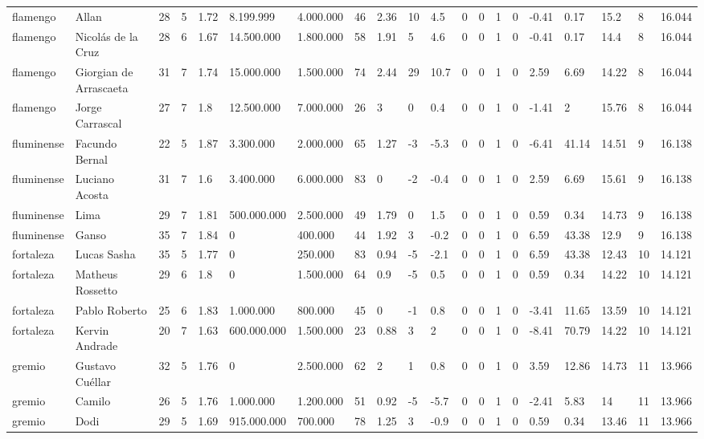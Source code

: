 \begin{longtable}{llllllllllllllllllll}
flamengo & Allan & 28 & 5 & 1.72 & 8.199.999 & 4.000.000 & 46 & 2.36 & 10 & 4.5 & 0 & 0 & 1 & 0 & -0.41 & 0.17 & 15.2 & 8 & 16.044 \\
flamengo & Nicolás de la Cruz & 28 & 6 & 1.67 & 14.500.000 & 1.800.000 & 58 & 1.91 & 5 & 4.6 & 0 & 0 & 1 & 0 & -0.41 & 0.17 & 14.4 & 8 & 16.044 \\
flamengo & Giorgian de Arrascaeta & 31 & 7 & 1.74 & 15.000.000 & 1.500.000 & 74 & 2.44 & 29 & 10.7 & 0 & 0 & 1 & 0 & 2.59 & 6.69 & 14.22 & 8 & 16.044 \\
flamengo & Jorge Carrascal & 27 & 7 & 1.8 & 12.500.000 & 7.000.000 & 26 & 3 & 0 & 0.4 & 0 & 0 & 1 & 0 & -1.41 & 2 & 15.76 & 8 & 16.044 \\
fluminense & Facundo Bernal & 22 & 5 & 1.87 & 3.300.000 & 2.000.000 & 65 & 1.27 & -3 & -5.3 & 0 & 0 & 1 & 0 & -6.41 & 41.14 & 14.51 & 9 & 16.138 \\
fluminense & Luciano Acosta & 31 & 7 & 1.6 & 3.400.000 & 6.000.000 & 83 & 0 & -2 & -0.4 & 0 & 0 & 1 & 0 & 2.59 & 6.69 & 15.61 & 9 & 16.138 \\
fluminense & Lima & 29 & 7 & 1.81 & 500.000.000 & 2.500.000 & 49 & 1.79 & 0 & 1.5 & 0 & 0 & 1 & 0 & 0.59 & 0.34 & 14.73 & 9 & 16.138 \\
fluminense & Ganso & 35 & 7 & 1.84 & 0 & 400.000 & 44 & 1.92 & 3 & -0.2 & 0 & 0 & 1 & 0 & 6.59 & 43.38 & 12.9 & 9 & 16.138 \\
fortaleza & Lucas Sasha & 35 & 5 & 1.77 & 0 & 250.000 & 83 & 0.94 & -5 & -2.1 & 0 & 0 & 1 & 0 & 6.59 & 43.38 & 12.43 & 10 & 14.121 \\
fortaleza & Matheus Rossetto & 29 & 6 & 1.8 & 0 & 1.500.000 & 64 & 0.9 & -5 & 0.5 & 0 & 0 & 1 & 0 & 0.59 & 0.34 & 14.22 & 10 & 14.121 \\
fortaleza & Pablo Roberto & 25 & 6 & 1.83 & 1.000.000 & 800.000 & 45 & 0 & -1 & 0.8 & 0 & 0 & 1 & 0 & -3.41 & 11.65 & 13.59 & 10 & 14.121 \\
fortaleza & Kervin Andrade & 20 & 7 & 1.63 & 600.000.000 & 1.500.000 & 23 & 0.88 & 3 & 2 & 0 & 0 & 1 & 0 & -8.41 & 70.79 & 14.22 & 10 & 14.121 \\
gremio & Gustavo Cuéllar & 32 & 5 & 1.76 & 0 & 2.500.000 & 62 & 2 & 1 & 0.8 & 0 & 0 & 1 & 0 & 3.59 & 12.86 & 14.73 & 11 & 13.966 \\
gremio & Camilo & 26 & 5 & 1.76 & 1.000.000 & 1.200.000 & 51 & 0.92 & -5 & -5.7 & 0 & 0 & 1 & 0 & -2.41 & 5.83 & 14 & 11 & 13.966 \\
gremio & Dodi & 29 & 5 & 1.69 & 915.000.000 & 700.000 & 78 & 1.25 & 3 & -0.9 & 0 & 0 & 1 & 0 & 0.59 & 0.34 & 13.46 & 11 & 13.966 \\

\end{longtable}
